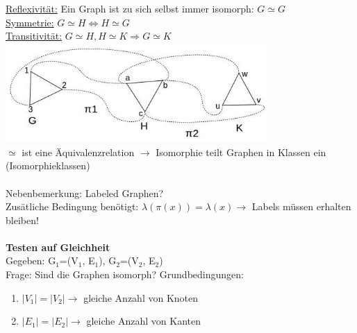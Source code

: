 \underline{Reflexivität:} Ein Graph ist zu sich selbst immer isomorph: $G \simeq G$\\
\underline{Symmetrie:} $G \simeq H \Leftrightarrow H \simeq G$\\
\underline{Transitivität:} $G \simeq H, H \simeq K \Rightarrow G \simeq K$\\
\includegraphics[width=0.75\textwidth]{lectures/161014/pix/7.jpg}
\\
$\simeq$ ist eine Äquivalenzrelation $\rightarrow$ Isomorphie teilt Graphen in Klassen ein (Isomorphieklassen)
\\\\
Nebenbemerkung: Labeled Graphen?\\
Zusätliche Bedingung benötigt: $\lambda(\pi(x))=\lambda(x) \rightarrow$ Labels müssen erhalten bleiben!
\\\\
\textbf{Testen auf Gleichheit}\\
Gegeben: G$_1$=(V$_1$, E$_1$), G$_2$=(V$_2$, E$_2$)\\
Frage: Sind die Graphen isomorph?
\newpage
Grundbedingungen:
\begin{enumerate}
	\item $|V_1| = |V_2| \rightarrow$ gleiche Anzahl von Knoten
	\item $|E_1| = |E_2| \rightarrow$ gleiche Anzahl von Kanten
\end{enumerate}

